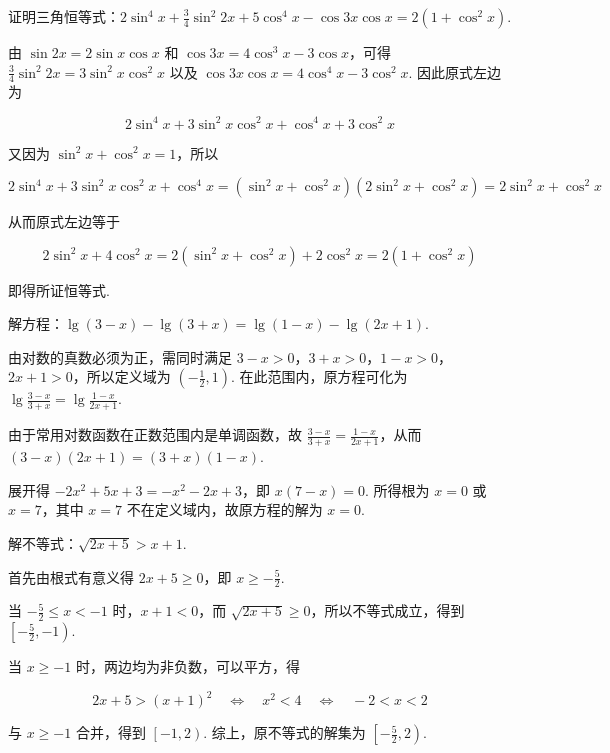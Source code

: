 \documentclass[UTF8,a4paper,oneside,11pt]{ctexbook}
\begin{document}
\begin{problem}

证明三角恒等式：\(2\sin^4 x+\frac{3}{4}\sin^2 2x+5\cos^4 x-\cos 3x\cos x=2(1+\cos^2 x)\).
\end{problem}

\begin{solution}
由 \(\sin 2x=2\sin x\cos x\) 和 \(\cos 3x=4\cos^3x-3\cos x\)，可得 \(\frac{3}{4}\sin^2 2x=3\sin^2x\cos^2x\) 以及 \(\cos 3x\cos x=4\cos^4x-3\cos^2x\). 因此原式左边为

\[
2\sin^4x+3\sin^2x\cos^2x+\cos^4x+3\cos^2x
\]

又因为 \(\sin^2x+\cos^2x=1\)，所以

\[
2\sin^4x+3\sin^2x\cos^2x+\cos^4x
=\left(\sin^2x+\cos^2x\right)\left(2\sin^2x+\cos^2x\right)
=2\sin^2x+\cos^2x
\]

从而原式左边等于

\[
2\sin^2x+4\cos^2x
=2\left(\sin^2x+\cos^2x\right)+2\cos^2x
=2\left(1+\cos^2x\right)
\]

即得所证恒等式.
\end{solution}

\begin{problem}

解方程：\(\lg (3-x)-\lg (3+x)=\lg (1-x)-\lg (2x+1)\).
\end{problem}

\begin{solution}
由对数的真数必须为正，需同时满足 \(3-x>0\)，\(3+x>0\)，\(1-x>0\)，\(2x+1>0\)，所以定义域为 \(\left(-\frac{1}{2},1\right)\). 在此范围内，原方程可化为
\(\lg\frac{3-x}{3+x}=\lg\frac{1-x}{2x+1}\).

由于常用对数函数在正数范围内是单调函数，故
\(\frac{3-x}{3+x}=\frac{1-x}{2x+1}\)，从而
\(\left(3-x\right)\left(2x+1\right)=\left(3+x\right)\left(1-x\right)\).

展开得 \(-2x^2+5x+3=-x^2-2x+3\)，即 \(x\left(7-x\right)=0\). 所得根为 \(x=0\) 或 \(x=7\)，其中 \(x=7\) 不在定义域内，故原方程的解为 \(x=0\).
\end{solution}

\begin{problem}

解不等式：\(\sqrt{2x+5}>x+1\).
\end{problem}

\begin{solution}
首先由根式有意义得 \(2x+5\geqslant0\)，即 \(x\geqslant-\frac{5}{2}\).

当 \(-\frac{5}{2}\leqslant x<-1\) 时，\(x+1<0\)，而 \(\sqrt{2x+5}\geqslant0\)，所以不等式成立，得到 \(\left[-\frac{5}{2},-1\right)\).

当 \(x\geqslant-1\) 时，两边均为非负数，可以平方，得

\[
2x+5>\left(x+1\right)^2
\quad\Longleftrightarrow\quad
x^2<4
\quad\Longleftrightarrow\quad
-2<x<2
\]

与 \(x\geqslant-1\) 合并，得到 \(\left[-1,2\right)\). 综上，原不等式的解集为 \(\left[-\frac{5}{2},2\right)\).
\end{solution}
\end{document}
